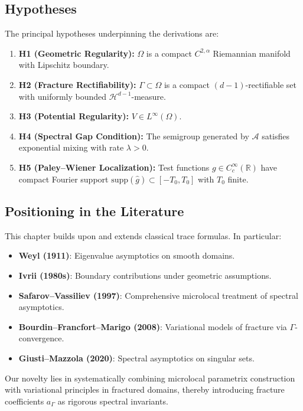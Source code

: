 \subsection*{Hypotheses}

The principal hypotheses underpinning the derivations are:

\begin{enumerate}[label=\textbf{H\arabic*}]
  \item \textbf{H1 (Geometric Regularity):} $\Omega$ is a compact $C^{2,\alpha}$
  Riemannian manifold with Lipschitz boundary.
  \item \textbf{H2 (Fracture Rectifiability):} $\Gamma \subset \Omega$ is a
  compact $(d-1)$-rectifiable set with uniformly bounded
  $\mathcal{H}^{d-1}$-measure.
  \item \textbf{H3 (Potential Regularity):} $V \in L^\infty(\Omega)$.
  \item \textbf{H4 (Spectral Gap Condition):} The semigroup generated by
  $\mathcal{A}$ satisfies exponential mixing with rate $\lambda > 0$.
  \item \textbf{H5 (Paley–Wiener Localization):} Test functions $g \in
  C_c^\infty(\mathbb{R})$ have compact Fourier support $\mathrm{supp}(\hat g)
  \subset [-T_0,T_0]$ with $T_0$ finite.
\end{enumerate}

\subsection*{Positioning in the Literature}

This chapter builds upon and extends classical trace formulas. In particular:

\begin{itemize}
  \item \textbf{Weyl (1911)}: Eigenvalue asymptotics on smooth domains.
  \item \textbf{Ivrii (1980s)}: Boundary contributions under geometric
  assumptions.
  \item \textbf{Safarov–Vassiliev (1997)}: Comprehensive microlocal treatment
  of spectral asymptotics.
  \item \textbf{Bourdin–Francfort–Marigo (2008)}: Variational models of
  fracture via $\Gamma$-convergence.
  \item \textbf{Giusti–Mazzola (2020)}: Spectral asymptotics on singular sets.
\end{itemize}

Our novelty lies in systematically combining microlocal parametrix
construction with variational principles in fractured domains, thereby
introducing fracture coefficients $a_\Gamma$ as rigorous spectral invariants.

